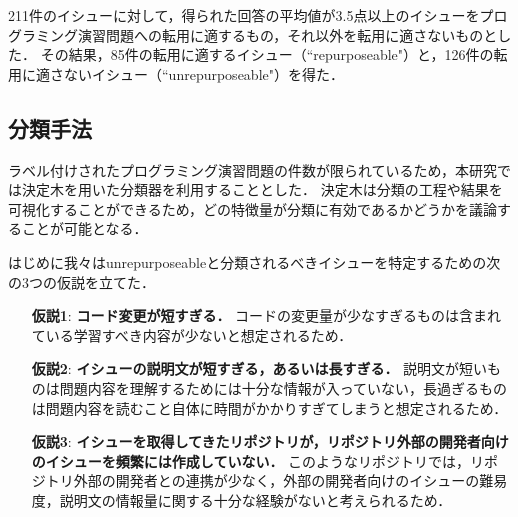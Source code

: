 211件のイシューに対して，得られた回答の平均値が3.5点以上のイシューをプログラミング演習問題への転用に適するもの，それ以外を転用に適さないものとした．
その結果，85件の転用に適するイシュー（``repurposeable"）と，126件の転用に適さないイシュー（``unrepurposeable"）を得た．


\subsection{分類手法}
% 
ラベル付けされたプログラミング演習問題の件数が限られているため，本研究では決定木を用いた分類器を利用することとした．
決定木は分類の工程や結果を可視化することができるため，どの特徴量が分類に有効であるかどうかを議論することが可能となる．


はじめに我々はunrepurposeableと分類されるべきイシューを特定するための次の3つの仮説を立てた．
\begin{itemize}
\item[\textbf{仮説1}: ] \textbf{コード変更が短すぎる．} コードの変更量が少なすぎるものは含まれている学習すべき内容が少ないと想定されるため．
\item[\textbf{仮説2}: ] \textbf{イシューの説明文が短すぎる，あるいは長すぎる．} 説明文が短いものは問題内容を理解するためには十分な情報が入っていない，長過ぎるものは問題内容を読むこと自体に時間がかかりすぎてしまうと想定されるため．
\item[\textbf{仮説3}: ] \textbf{イシューを取得してきたリポジトリが，リポジトリ外部の開発者向けのイシューを頻繁には作成していない．} このようなリポジトリでは，リポジトリ外部の開発者との連携が少なく，外部の開発者向けのイシューの難易度，説明文の情報量に関する十分な経験がないと考えられるため．
\end{itemize}

